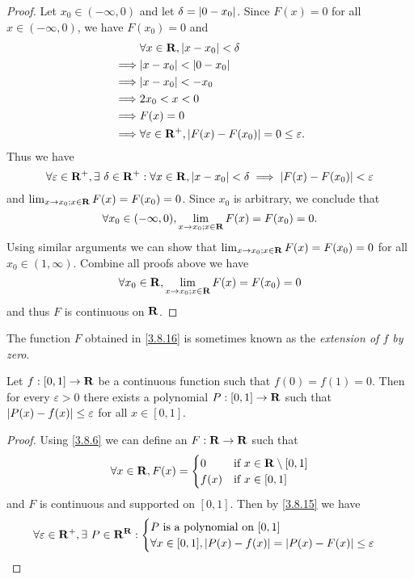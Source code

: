 \begin{proof}
  Let \(x_0 \in (-\infty, 0)\) and let \(\delta = \left\lvert0 - x_0\right\rvert\).
  Since \(F(x) = 0\) for all \(x \in (-\infty, 0)\), we have \(F(x_0) = 0\) and
  \begin{align*}
             & \forall x \in \R, \abs{x - x_0} < \delta                                \\
    \implies & \abs{x - x_0} < \abs{0 - x_0}                                           \\
    \implies & \abs{x - x_0} < -x_0                                                    \\
    \implies & 2x_0 < x < 0                                                            \\
    \implies & F(x) = 0                                                                \\
    \implies & \forall \varepsilon \in \R^+, \abs{F(x) - F(x_0)} = 0 \leq \varepsilon.
  \end{align*}
  Thus we have
  \[
    \forall \varepsilon \in \mathbf{R}^+, \exists\ \delta \in \mathbf{R}^+ : \forall x \in \mathbf{R}, \left\lvert x - x_0\right\rvert < \delta \implies \left\lvert F(x) - F(x_0)\right\rvert < \varepsilon
  \]
  and \(\lim_{x \to x_0 ; x \in \mathbf{R}} F(x) = F(x_0) = 0\).
  Since \(x_0\) is arbitrary, we conclude that
  \[
    \forall x_0 \in (-\infty, 0), \lim_{x \to x_0 ; x \in \mathbf{R}} F(x) = F(x_0) = 0.
  \]
  Using similar arguments we can show that \(\lim_{x \to x_0 ; x \in \mathbf{R}} F(x) = F(x_0) = 0\) for all \(x_0 \in (1, \infty)\).
  Combine all proofs above we have
  \[
    \forall x_0 \in \mathbf{R}, \lim_{x \to x_0 ; x \in \mathbf{R}} F(x) = F(x_0) = 0
  \]
  and thus \(F\) is continuous on \(\mathbf{R}\).
\end{proof}

\begin{remark}\label{3.8.17}
  The function \(F\) obtained in \cref{3.8.16} is sometimes known as the \emph{extension of \(f\) by zero}.
\end{remark}

\begin{corollary}\label{3.8.18}
  Let \(f : [0, 1] \to \mathbf{R}\) be a continuous function such that \(f(0) = f(1) = 0\).
  Then for every \(\varepsilon > 0\) there exists a polynomial \(P : [0, 1] \to \mathbf{R}\) such that \(\left\lvert P(x) - f(x)\right\rvert \leq \varepsilon\) for all \(x \in [0, 1]\).
\end{corollary}

\begin{proof}
  Using \cref{3.8.6} we can define an \(F : \mathbf{R} \to \mathbf{R}\) such that
  \[
    \forall x \in \mathbf{R}, F(x) = \begin{cases}
      0    & \text{if } x \in \mathbf{R} \setminus [0, 1] \\
      f(x) & \text{if } x \in [0, 1]
    \end{cases}
  \]
  and \(F\) is continuous and supported on \([0, 1]\).
  Then by \cref{3.8.15} we have
  \[
    \forall \varepsilon \in \mathbf{R}^+, \exists\ P \in \mathbf{R}^{\mathbf{R}} : \begin{cases}
      P \text{ is a polynomial on } [0, 1] \\
      \forall x \in [0, 1], \left\lvert P(x) - f(x)\right\rvert = \left\lvert P(x) - F(x)\right\rvert \leq \varepsilon
    \end{cases}
  \]
\end{proof}

